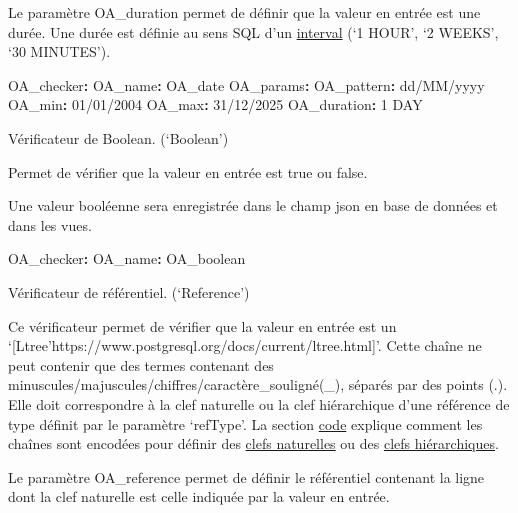 \documentclass[
  letterpaper,
  DIV=11,
  numbers=noendperiod]{scrartcl}
\newenvironment{Shaded}{\begin{snugshade}}{\end{snugshade}}
\newcommand{\AttributeTok}[1]{\textcolor[rgb]{0.40,0.45,0.13}{#1}}
\newcommand{\FunctionTok}[1]{\textcolor[rgb]{0.28,0.35,0.67}{#1}}
\newcommand{\KeywordTok}[1]{\textcolor[rgb]{0.00,0.23,0.31}{\textbf{#1}}}
\begin{document}
Le paramètre OA\_duration permet de définir que la valeur en entrée est
une durée. Une durée est définie au sens SQL d'un
\href{https://www.postgresql.org/docs/current/functions-datetime.html\#OPERATORS-DATETIME-TABLE}{interval}
(`1 HOUR', `2 WEEKS', `30 MINUTES').

\begin{Shaded}
\begin{Highlighting}[]
\AttributeTok{    }\FunctionTok{OA\_checker}\KeywordTok{:}
\AttributeTok{        }\FunctionTok{OA\_name}\KeywordTok{:}\AttributeTok{ OA\_date}
\AttributeTok{        }\FunctionTok{OA\_params}\KeywordTok{:}\AttributeTok{ }
\AttributeTok{            }\FunctionTok{OA\_pattern}\KeywordTok{:}\AttributeTok{ dd/MM/yyyy}
\AttributeTok{            }\FunctionTok{OA\_min}\KeywordTok{:}\AttributeTok{ 01/01/2004}
\AttributeTok{            }\FunctionTok{OA\_max}\KeywordTok{:}\AttributeTok{ 31/12/2025}
\AttributeTok{            }\FunctionTok{OA\_duration}\KeywordTok{:}\AttributeTok{ 1 DAY}
\end{Highlighting}
\end{Shaded}

Vérificateur de Boolean. (`Boolean')

Permet de vérifier que la valeur en entrée est true ou false.

Une valeur booléenne sera enregistrée dans le champ json en base de
données et dans les vues.

\begin{Shaded}
\begin{Highlighting}[]
\AttributeTok{    }\FunctionTok{OA\_checker}\KeywordTok{:}
\AttributeTok{        }\FunctionTok{OA\_name}\KeywordTok{:}\AttributeTok{ OA\_boolean}
\end{Highlighting}
\end{Shaded}

Vérificateur de référentiel. (`Reference')

Ce vérificateur permet de vérifier que la valeur en entrée est un
`{[}Ltree'https://www.postgresql.org/docs/current/ltree.html{]}'. Cette
chaîne ne peut contenir que des termes contenant des
minuscules/majuscules/chiffres/caractère\_souligné(\_), séparés par des
points (.). Elle doit correspondre à la clef naturelle ou la clef
hiérarchique d'une référence de type définit par le paramètre `refType'.
La section \url{code} explique comment les chaînes sont encodées pour
définir des \href{naturalKey}{clefs naturelles} ou des
\href{hierarchicalKey}{clefs hiérarchiques}.

Le paramètre OA\_reference permet de définir le référentiel contenant la
ligne dont la clef naturelle est celle indiquée par la valeur en entrée.
\end{document}
